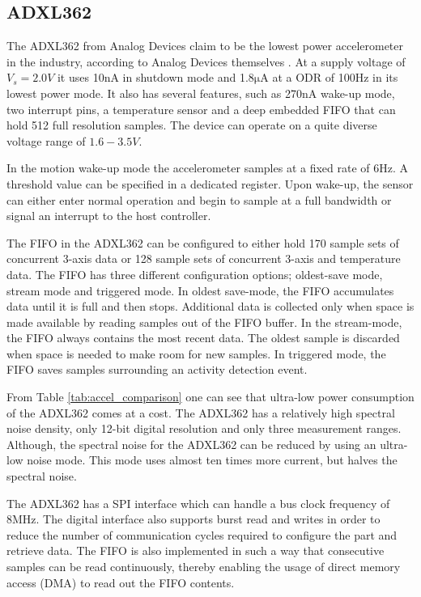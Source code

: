 \subsection{ADXL362}

The ADXL362 from Analog Devices claim to be the lowest power accelerometer in the industry, according to Analog Devices themselves \cite{analog12}. At a supply voltage of $V_s = 2.0 V$ it uses 10nA in shutdown mode and 1.8$\si{\micro\ampere}$ at a ODR of 100Hz in its lowest power mode. It also has several features, such as 270nA wake-up mode, two interrupt pins, a temperature sensor and a deep embedded FIFO that can hold 512 full resolution samples. The device can operate on a quite diverse voltage range of $1.6-3.5V$.

In the motion wake-up mode the accelerometer samples at a fixed rate of 6Hz. A threshold value can be specified in a dedicated register. Upon wake-up, the sensor can either enter normal operation and begin to sample at a full bandwidth or signal an interrupt to the host controller.

The FIFO in the ADXL362 can be configured to either hold 170 sample sets of concurrent 3-axis data or 128 sample sets of concurrent 3-axis and temperature data. The FIFO has three different configuration options; oldest-save mode, stream mode and triggered mode. In oldest save-mode, the  FIFO accumulates data until it is full and then stops. Additional data is collected only when space is made available by reading samples out of the FIFO buffer. In the stream-mode, the FIFO always contains the most recent data. The oldest sample is discarded when space is needed to make room for new samples. In triggered mode, the FIFO saves samples surrounding an activity detection event.

From Table \ref{tab:accel_comparison} one can see that ultra-low power consumption of the ADXL362 comes at a cost. The ADXL362 has a relatively high spectral noise density, only 12-bit digital resolution and only three measurement ranges. Although, the spectral noise for the ADXL362 can be reduced by using an ultra-low noise mode. This mode uses almost ten times more current, but halves the spectral noise.

The ADXL362 has a SPI interface which can handle a bus clock frequency of 8MHz. The digital interface also supports burst read and writes in order to reduce the number of communication cycles required to configure the part and retrieve data. The FIFO is also implemented in such a way that consecutive samples can be read continuously, thereby enabling the usage of direct memory access (DMA) to read out the FIFO contents.

